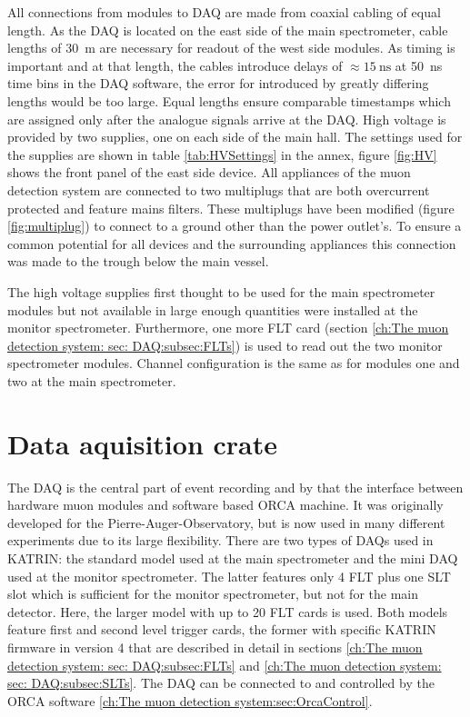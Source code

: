   All connections from modules to DAQ are made from coaxial cabling of equal length. As the DAQ is located on the east side of the main spectrometer, cable lengths of \SI{30}{\meter} are necessary for readout of the west side modules. As timing is important and at that length, the cables introduce delays of $\approx \SI{15}{\nano\second}$ at \SI{50}{\nano\second} time bins in the DAQ software, the error for introduced by greatly differing lengths would be too large. Equal lengths ensure comparable timestamps which are assigned only after the analogue signals arrive at the DAQ. High voltage is provided by two supplies, one on each side of the main hall. The settings used for the supplies are shown in table \ref{tab:HVSettings} in the annex, figure \ref{fig:HV} shows the front panel of the east side device.
  All appliances of the muon detection system are connected to two multiplugs that are both overcurrent protected and feature mains filters. These multiplugs have been modified (figure \ref{fig:multiplug}) to connect to a ground other than the power outlet's. To ensure a common potential for all devices and the surrounding appliances this connection was made to the trough below the main vessel.

  The high voltage supplies first thought to be used for the main spectrometer modules but not available in large enough quantities were installed at the monitor spectrometer. Furthermore, one more FLT card (section \ref{ch:The muon detection system: sec: DAQ:subsec:FLTs}) is used to read out the two monitor spectrometer modules. Channel configuration is the same as for modules one and two at the main spectrometer.



\section{Data aquisition crate}
\label{ch:The muon detection system: sec: DAQ}
The DAQ is the central part of event recording and by that the interface between hardware muon modules and software based ORCA machine. It was originally developed for the Pierre-Auger-Observatory, but is now used in many different experiments due to its large flexibility. There are two types of DAQs used in KATRIN: the standard model used at the main spectrometer and the mini DAQ used at the monitor spectrometer. The latter features only 4 FLT plus one SLT slot which is sufficient for the monitor spectrometer, but not for the main detector. Here, the larger model with up to 20 FLT cards is used. Both models feature first and second level trigger cards, the former with specific KATRIN firmware in version \SI{4}{} that are described in detail in sections \ref{ch:The muon detection system: sec: DAQ:subsec:FLTs} and \ref{ch:The muon detection system: sec: DAQ:subsec:SLTs}. The DAQ can be connected to and controlled by the ORCA software \ref{ch:The muon detection system:sec:OrcaControl}. 


